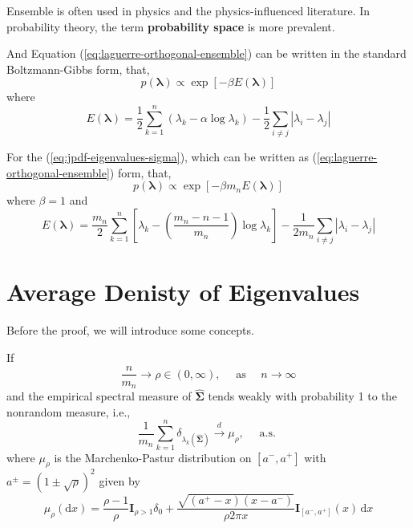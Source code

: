 \begin{remark}
    Ensemble is often used in physics and the physics-influenced literature. In probability theory, the term \textbf{probability space} is more prevalent.
\end{remark}

And Equation (\ref{eq:laguerre-orthogonal-ensemble}) can be written in the standard Boltzmann-Gibbs form, that,
\begin{equation*}
    p\left(\boldsymbol{\lambda}\right)\propto\exp\left[-\beta E\left(\boldsymbol{\lambda}\right)\right]
\end{equation*}
where
\begin{equation}
    E\left(\boldsymbol{\lambda}\right)=\frac{1}{2}\sum_{k=1}^{n}\left(\lambda_{k}-\alpha\log\lambda_{k}\right)-\frac{1}{2}\sum_{i\neq j}\left|\lambda_{i}-\lambda_{j}\right|
\end{equation}

For the (\ref{eq:jpdf-eigenvalues-sigma}), which can be written as (\ref{eq:laguerre-orthogonal-ensemble}) form, that,
\begin{equation*}
    p\left(\boldsymbol{\lambda}\right)\propto\exp\left[-\beta m_{n}E\left(\boldsymbol{\lambda}\right)\right]
\end{equation*}
where $\beta=1$ and
\begin{equation*}
    E\left(\boldsymbol{\lambda}\right)=\frac{m_{n}}{2}\sum_{k=1}^{n}\left[\lambda_{k}-\left(\frac{m_{n}-n-1}{m_{n}}\right)\log\lambda_{k}\right]-\frac{1}{2m_{n}}\sum_{i\neq j}\left|\lambda_{i}-\lambda_{j}\right|
\end{equation*}

\section{Average Denisty of  Eigenvalues}

Before the proof, we will introduce some concepts.


\begin{theorem}
    If
    \begin{equation*}
        \frac{n}{m_{n}}\rightarrow\rho\in(0,\infty),\quad\text{ as }\quad n\rightarrow\infty
    \end{equation*}
    and the empirical spectral measure of $\widehat{\boldsymbol{\Sigma}}$ tends weakly with probability 1 to the nonrandom measure, i.e.,
    \begin{equation}
        \frac{1}{m_{n}}\sum_{k=1}^{n}\delta_{\lambda_{k}(\widehat{\boldsymbol{\Sigma}})}\stackrel{d}{\rightarrow}\mu_{\rho},\quad\text{ a.s. }
    \end{equation}
    where $\mu_{\rho}$ is the Marchenko-Pastur distribution on $\left[a^{-},a^{+}\right]$ with $a^{\pm}=(1\pm\sqrt{\rho})^{2}$ given by
    \begin{equation}
        \mu_{\rho}(\mathrm{d}x)=\frac{\rho-1}{\rho}\mathbf{I}_{\rho>1}\delta_{0}+\frac{\sqrt{\left(a^{+}-x\right)\left(x-a^{-}\right)}}{\rho 2\pi x}\mathbf{I}_{\left[a^{-},a^{+}\right]}(x)\,\mathrm{d}x
    \end{equation}
\end{theorem}

